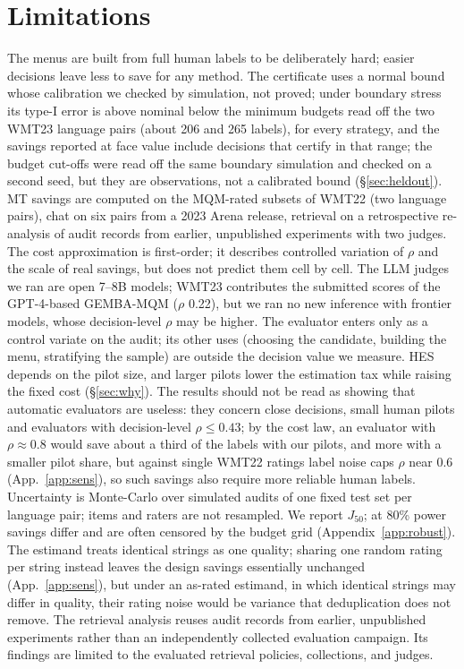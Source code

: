 \documentclass[11pt]{article}
\newcommand{\Jt}{J_{50}}
\begin{document}
\section*{Limitations}
The menus are built from full human labels to be deliberately hard; easier decisions leave less to save for any method.
The certificate uses a normal bound whose calibration we checked by simulation, not proved; under boundary stress its
type-I error is above nominal below the minimum budgets read off the two WMT23 language pairs (about 206 and 265
labels), for every strategy, and the savings reported at face value include decisions that certify in that range; the budget cut-offs were read off the same boundary simulation and
checked on a second seed, but they are observations, not a calibrated bound (\S\ref{sec:heldout}). MT savings are computed on
the MQM-rated subsets of WMT22 (two language pairs), chat on six pairs from a 2023 Arena release, retrieval on
a retrospective re-analysis of audit records from earlier, unpublished experiments with two judges. The cost approximation is first-order; it describes
controlled variation of $\rho$ and the scale of real savings, but does not predict them cell by cell. The LLM judges we ran are open 7--8B models; WMT23 contributes the submitted scores of the GPT-4-based GEMBA-MQM
($\rho$ 0.22), but we ran no new inference with frontier models, whose decision-level $\rho$ may be higher. The evaluator enters only as a control
variate on the audit; its other uses (choosing the candidate, building the menu, stratifying the sample) are outside
the decision value we measure. HES depends on the pilot size, and larger pilots
lower the estimation tax while raising the fixed cost (\S\ref{sec:why}). The results should not be read as showing
that automatic evaluators are useless: they concern close decisions, small human pilots and evaluators with
decision-level $\rho\le0.43$; by the cost law, an evaluator with $\rho\approx0.8$ would save about a third of the labels with our pilots, and more
with a smaller pilot share, but against single WMT22 ratings label noise caps $\rho$ near 0.6 (App.~\ref{app:sens}), so such
savings also require more reliable human labels. Uncertainty is Monte-Carlo over simulated audits of one fixed test set per language pair;
items and raters are not resampled. We report $\Jt$; at 80\% power savings differ and are often censored by the budget
grid (Appendix~\ref{app:robust}). The estimand treats identical strings as one quality; sharing one random rating per string
instead leaves the design savings essentially unchanged (App.~\ref{app:sens}), but under an as-rated estimand, in which identical
strings may differ in quality, their rating noise would be variance that deduplication does not remove. The retrieval analysis reuses audit records from earlier,
unpublished experiments rather than an independently collected
evaluation campaign. Its findings are limited to the evaluated
retrieval policies, collections, and judges.
\end{document}

